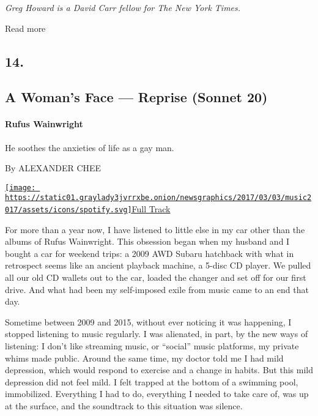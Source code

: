 \emph{Greg Howard is a David Carr fellow for The New York Times.}

Read more

\hypertarget{14}{%
\subsection{14.}\label{14}}

\hypertarget{--a-womans-face--reprise-sonnet-20}{%
\subsection{\texorpdfstring{ A Woman's Face --- Reprise (Sonnet
20)}{  A Woman's Face --- Reprise (Sonnet 20)}}\label{--a-womans-face--reprise-sonnet-20}}

\hypertarget{rufus-wainwright}{%
\paragraph{Rufus Wainwright}\label{rufus-wainwright}}

He soothes the anxieties of life as a gay man.

By ALEXANDER CHEE

\href{https://open.spotify.com/track/5D12h7kioqQdCKzoDiUfvJ}{\texttt{[image: https://static01.graylady3jvrrxbe.onion/newsgraphics/2017/03/03/music2017/assets/icons/spotify.svg]}Full
Track}

For more than a year now, I have listened to little else in my car other
than the albums of Rufus Wainwright. This obsession began when my
husband and I bought a car for weekend trips: a 2009 AWD Subaru
hatchback with what in retrospect seems like an ancient playback
machine, a 5-disc CD player. We pulled all our old CD wallets out to the
car, loaded the changer and set off for our first drive. And what had
been my self-imposed exile from music came to an end that day.

Sometime between 2009 and 2015, without ever noticing it was happening,
I stopped listening to music regularly. I was alienated, in part, by the
new ways of listening: I don't like streaming music, or ``social'' music
platforms, my private whims made public. Around the same time, my doctor
told me I had mild depression, which would respond to exercise and a
change in habits. But this mild depression did not feel mild. I felt
trapped at the bottom of a swimming pool, immobilized. Everything I had
to do, everything I needed to take care of, was up at the surface, and
the soundtrack to this situation was silence.

